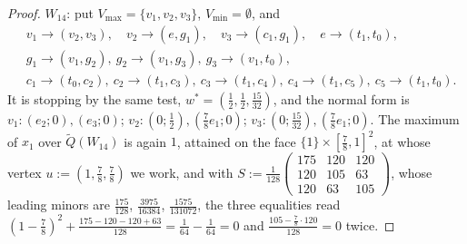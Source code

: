 \documentclass[11pt]{article}
\theoremstyle{plain}
\theoremstyle{definition}
\newcommand{\Vmax}{V_{\max}}
\newcommand{\Vmin}{V_{\min}}
\begin{document}
\begin{proof}
$W_{14}$: put $\Vmax=\{v_1,v_2,v_3\}$, $\Vmin=\emptyset$, and
\[
 \begin{aligned}
  &v_1\to(v_2,v_3),\quad v_2\to(e,g_1),\quad v_3\to(c_1,g_1),\quad e\to(t_1,t_0),\\
  &g_1\to(v_1,g_2),\ g_2\to(v_1,g_3),\ g_3\to(v_1,t_0),\\
  &c_1\to(t_0,c_2),\ c_2\to(t_1,c_3),\ c_3\to(t_1,c_4),\ c_4\to(t_1,c_5),\ c_5\to(t_1,t_0).
 \end{aligned}
\]
It is stopping by the same test, $w^\ast=(\tfrac12,\tfrac12,\tfrac{15}{32})$,
and the normal form is $v_1:(e_2;0),(e_3;0)$; $v_2:(0;\tfrac12),(\tfrac78e_1;0)$;
$v_3:(0;\tfrac{15}{32}),(\tfrac78e_1;0)$. The maximum of $x_1$ over
$\tilde Q(W_{14})$ is again $1$, attained on the face
$\{1\}\times[\tfrac78,1]^{2}$, at whose vertex $u:=(1,\tfrac78,\tfrac78)$ we
work,
and with
$S:=\tfrac1{128}\left(\begin{smallmatrix}175&120&120\\120&105&63\\120&63&105\end{smallmatrix}\right)$,
whose leading minors are $\tfrac{175}{128}$, $\tfrac{3975}{16384}$,
$\tfrac{1575}{131072}$, the three equalities read
$(1-\tfrac78)^2+\tfrac{175-120-120+63}{128}=\tfrac1{64}-\tfrac1{64}=0$ and
$\tfrac{105-\tfrac78\cdot120}{128}=0$ twice.
\end{proof}
\end{document}
